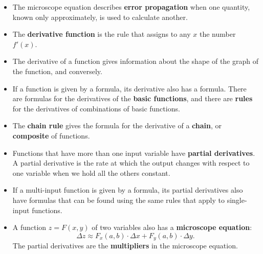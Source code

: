 \begin{itemize}
\item The microscope equation describes {\bf error propagation} when
  one quantity, known only approximately, is used to calculate
  another.

\item The {\bf derivative function} is the rule that assigns to any
  $x$ the number $f'(x)$.

\item The derivative of a function gives information about the shape
  of the graph of the function, and conversely.

\item If a function is given by a formula, its derivative also has a
  formula.  There are formulas for the derivatives of the {\bf basic
    functions}, and there are {\bf rules} for the derivatives of
  combinations of basic functions.

\item The {\bf chain rule} gives the formula for the derivative of a
  {\bf chain}, or {\bf composite} of functions.

\item Functions that have more than one input variable have {\bf
  partial derivatives}.  A partial derivative is the rate at which the
  output changes with respect to one variable when we hold all the
  others constant.

\item If a multi-input function is given by a formula, its partial
  derivatives also have formulas that can be found using the same
  rules that apply to single-input functions.

\item A function $z = F(x, y)$ of two variables also has a {\bf
  microscope equation}:
	\[
\Delta z \approx F_x(a,b) \cdot \Delta x + F_y(a,b)
		\cdot \Delta y.
\]
The partial derivatives are the {\bf multipliers} in the microscope equation.  
\end{itemize}

